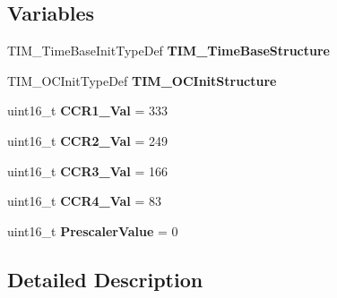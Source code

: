 \subsection*{Variables}
\begin{DoxyCompactItemize}
\item 
\hypertarget{group___t_i_m___p_w_m___output_gad2b9d014ac15d04c276608d776531753}{T\-I\-M\-\_\-\-Time\-Base\-Init\-Type\-Def {\bfseries T\-I\-M\-\_\-\-Time\-Base\-Structure}}\label{group___t_i_m___p_w_m___output_gad2b9d014ac15d04c276608d776531753}

\item 
\hypertarget{group___t_i_m___p_w_m___output_gac4d1bcad2e781ea94976c53a092163eb}{T\-I\-M\-\_\-\-O\-C\-Init\-Type\-Def {\bfseries T\-I\-M\-\_\-\-O\-C\-Init\-Structure}}\label{group___t_i_m___p_w_m___output_gac4d1bcad2e781ea94976c53a092163eb}

\item 
\hypertarget{group___t_i_m___p_w_m___output_ga6f8b36c3fa0abe403ff01ed72a35d6c2}{uint16\-\_\-t {\bfseries C\-C\-R1\-\_\-\-Val} = 333}\label{group___t_i_m___p_w_m___output_ga6f8b36c3fa0abe403ff01ed72a35d6c2}

\item 
\hypertarget{group___t_i_m___p_w_m___output_gafa479bcad7888878597e0f8791c15bfe}{uint16\-\_\-t {\bfseries C\-C\-R2\-\_\-\-Val} = 249}\label{group___t_i_m___p_w_m___output_gafa479bcad7888878597e0f8791c15bfe}

\item 
\hypertarget{group___t_i_m___p_w_m___output_gaa8f66c7a50c4683c0826550d9e873e4f}{uint16\-\_\-t {\bfseries C\-C\-R3\-\_\-\-Val} = 166}\label{group___t_i_m___p_w_m___output_gaa8f66c7a50c4683c0826550d9e873e4f}

\item 
\hypertarget{group___t_i_m___p_w_m___output_ga4497d6a05b9f20604474bfe52f1ea3f8}{uint16\-\_\-t {\bfseries C\-C\-R4\-\_\-\-Val} = 83}\label{group___t_i_m___p_w_m___output_ga4497d6a05b9f20604474bfe52f1ea3f8}

\item 
\hypertarget{group___t_i_m___p_w_m___output_ga926539c31db1b9beef91893c9e44fd20}{uint16\-\_\-t {\bfseries Prescaler\-Value} = 0}\label{group___t_i_m___p_w_m___output_ga926539c31db1b9beef91893c9e44fd20}

\end{DoxyCompactItemize}


\subsection{Detailed Description}


